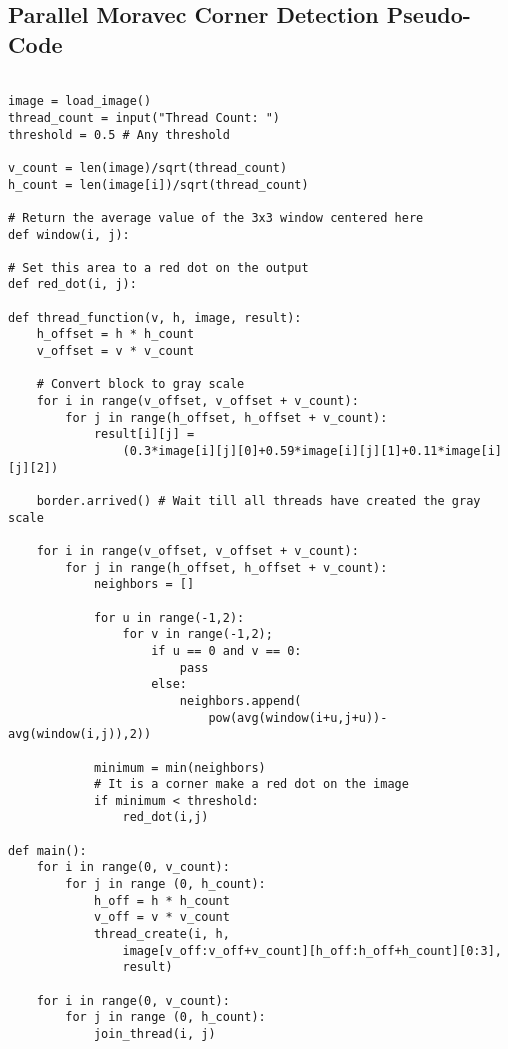 \documentclass{article}
\begin{document}
        \subsection{Parallel Moravec Corner Detection Pseudo-Code}
                \begin{lstlisting}[basicstyle=\footnotesize]

image = load_image()
thread_count = input("Thread Count: ")
threshold = 0.5 # Any threshold

v_count = len(image)/sqrt(thread_count)
h_count = len(image[i])/sqrt(thread_count)

# Return the average value of the 3x3 window centered here
def window(i, j):

# Set this area to a red dot on the output
def red_dot(i, j):

def thread_function(v, h, image, result):
    h_offset = h * h_count
    v_offset = v * v_count
    
    # Convert block to gray scale
    for i in range(v_offset, v_offset + v_count):
        for j in range(h_offset, h_offset + v_count):
            result[i][j] = 
                (0.3*image[i][j][0]+0.59*image[i][j][1]+0.11*image[i][j][2])
    
    border.arrived() # Wait till all threads have created the gray scale
    
    for i in range(v_offset, v_offset + v_count):
        for j in range(h_offset, h_offset + v_count):
            neighbors = []

            for u in range(-1,2):   
                for v in range(-1,2);
                    if u == 0 and v == 0:
                        pass
                    else:
                        neighbors.append(
                            pow(avg(window(i+u,j+u))-avg(window(i,j)),2))
            
            minimum = min(neighbors)
            # It is a corner make a red dot on the image
            if minimum < threshold:
                red_dot(i,j)

def main():
    for i in range(0, v_count):
        for j in range (0, h_count):
            h_off = h * h_count
            v_off = v * v_count
            thread_create(i, h, 
                image[v_off:v_off+v_count][h_off:h_off+h_count][0:3], 
                result)
                
    for i in range(0, v_count):
        for j in range (0, h_count):
            join_thread(i, j)

        \end{lstlisting}
        \pagebreak
\end{document}
